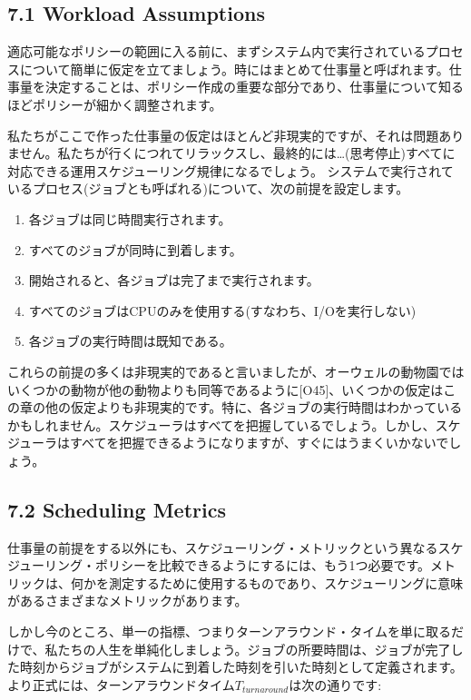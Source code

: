 \hypertarget{workload-assumptions}{%
\subsection*{7.1 Workload Assumptions}\label{workload-assumptions}}

適応可能なポリシーの範囲に入る前に、まずシステム内で実行されているプロセスについて簡単に仮定を立てましょう。時にはまとめて仕事量と呼ばれます。仕事量を決定することは、ポリシー作成の重要な部分であり、仕事量について知るほどポリシーが細かく調整されます。

私たちがここで作った仕事量の仮定はほとんど非現実的ですが、それは問題ありません。私たちが行くにつれてリラックスし、最終的には\ldots(思考停止)すべてに対応できる運用スケジューリング規律になるでしょう。
システムで実行されているプロセス(ジョブとも呼ばれる)について、次の前提を設定します。

\begin{enumerate}
\def\labelenumi{\arabic{enumi}.}
\tightlist
\item
  各ジョブは同じ時間実行されます。
\item
  すべてのジョブが同時に到着します。
\item
  開始されると、各ジョブは完了まで実行されます。
\item
  すべてのジョブはCPUのみを使用する(すなわち、I/Oを実行しない)
\item
  各ジョブの実行時間は既知である。
\end{enumerate}

これらの前提の多くは非現実的であると言いましたが、オーウェルの動物園ではいくつかの動物が他の動物よりも同等であるように{[}O45{]}、いくつかの仮定はこの章の他の仮定よりも非現実的です。特に、各ジョブの実行時間はわかっているかもしれません。スケジューラはすべてを把握しているでしょう。しかし、スケジューラはすべてを把握できるようになりますが、すぐにはうまくいかないでしょう。

\hypertarget{scheduling-metrics}{%
\subsection*{7.2 Scheduling Metrics}\label{scheduling-metrics}}

仕事量の前提をする以外にも、スケジューリング・メトリックという異なるスケジューリング・ポリシーを比較できるようにするには、もう1つ必要です。メトリックは、何かを測定するために使用するものであり、スケジューリングに意味があるさまざまなメトリックがあります。

しかし今のところ、単一の指標、つまりターンアラウンド・タイムを単に取るだけで、私たちの人生を単純化しましょう。ジョブの所要時間は、ジョブが完了した時刻からジョブがシステムに到着した時刻を引いた時刻として定義されます。より正式には、ターンアラウンドタイム\(T_{turnaround}\)は次の通りです:

